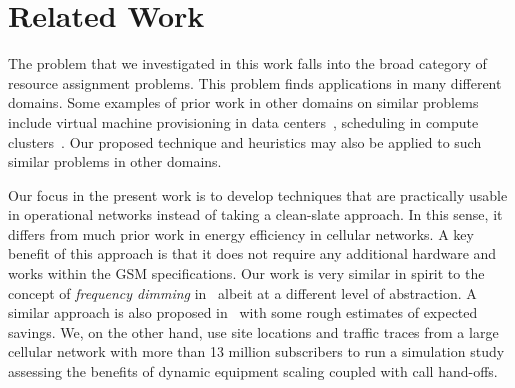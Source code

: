 \section{Related Work}
\label{sec:related} 
The problem that we investigated in this work falls into the broad category of resource assignment problems. This problem finds applications in many different domains. Some examples of prior work in other domains on similar problems include virtual machine provisioning in data centers~\cite{Jeyarani:2012:DIA:2148243.2148374}, scheduling in compute clusters~\cite{AlDaoud2012745}. Our proposed technique and heuristics may also be applied to such similar problems in other domains.

Our focus in the present work is to develop techniques that are practically usable in operational networks instead of taking a clean-slate approach. In this sense, it differs from much prior work in energy efficiency in cellular networks. A key benefit of this approach is that it 
does not require any additional hardware
and works within the GSM specifications. Our
work is very similar in spirit to the concept of
\textit{frequency dimming}
in~\cite{Tipper:Dimming:Globecom:2010} albeit at a different
level of abstraction. A similar approach is also proposed
in~\cite{Blume:2010:BLTJ:CellularPower} with some rough
estimates of expected savings. We, on the other hand, use site
locations and traffic traces from a large cellular network with
more than 13 million subscribers to run a simulation study
assessing the benefits of dynamic equipment scaling coupled
with call hand-offs. 